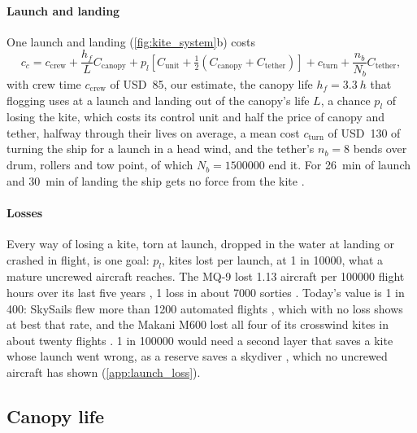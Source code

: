 \paragraph{Launch and landing} One launch and landing (\cref{fig:kite_system}b) costs
\begin{equation}
c_c = c_\mathrm{crew} + \frac{h_f}{L} C_\mathrm{canopy} + p_l \left[C_\mathrm{unit} + \tfrac12 (C_\mathrm{canopy} + C_\mathrm{tether})\right] + c_\mathrm{turn} + \frac{n_b}{N_b} C_\mathrm{tether},
\label{eq:cycle_cost}
\end{equation}
with crew time $c_\mathrm{crew}$ of USD~85, our estimate, the canopy life $h_f=\SI{3.3}{h}$ that flogging uses at a launch and landing out of the canopy's life $L$, a chance $p_l$ of losing the kite, which costs its control unit and half the price of canopy and tether, halfway through their lives on average, a mean cost $c_\mathrm{turn}$ of USD~130 of turning the ship for a launch in a head wind, and the tether's $n_b=8$ bends over drum, rollers and tow point, of which $N_b=\num{1500000}$ end it. For \SI{26}{min} of launch and \SI{30}{min} of landing the ship gets no force from the kite \citep{konstruktionspraxis_skysails}.

\paragraph{Losses} Every way of losing a kite, torn at launch, dropped in the water at landing or crashed in flight, is one goal: $p_l$, kites lost per launch, at 1 in \num{10000}, what a mature uncrewed aircraft reaches. The MQ-9 lost 1.13 aircraft per \num{100000} flight hours over its last five years \citep{usaf2022mq9}, 1 loss in about \num{7000} sorties \citep{airforcemag2015predatorb}. Today's value is 1 in 400: SkySails flew more than \num{1200} automated flights \citep{skysails2018}, which with no loss shows at best that rate, and the Makani M600 lost all four of its crosswind kites in about twenty flights \citep[Part I, pp.~248, 355]{echeverri2020part1}. 1 in \num{100000} would need a second layer that saves a kite whose launch went wrong, as a reserve saves a skydiver \citep{uspa2025safety}, which no uncrewed aircraft has shown (\cref{app:launch_loss}).

\subsection{Canopy life}
\label{sec:canopy_life}


